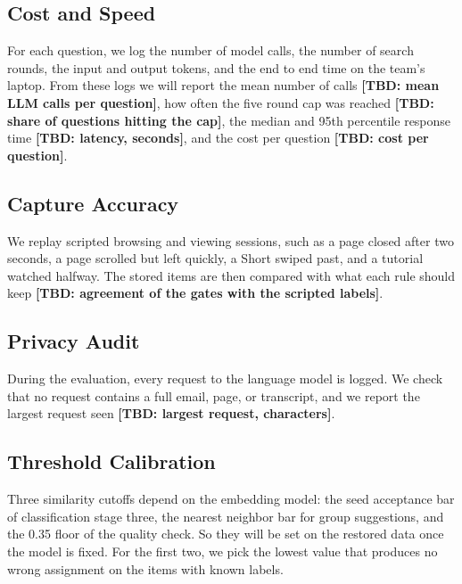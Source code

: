 \documentclass[conference]{IEEEtran}
\newcommand{\tbd}[1]{\textbf{[TBD: #1]}}
\begin{document}
\subsection{Cost and Speed}
For each question, we log the number of model calls, the number of search rounds, the input and output tokens, and the end to end time on the team's laptop. From these logs we will report the mean number of calls \tbd{mean LLM calls per question}, how often the five round cap was reached \tbd{share of questions hitting the cap}, the median and 95th percentile response time \tbd{latency, seconds}, and the cost per question \tbd{cost per question}.

\subsection{Capture Accuracy}
We replay scripted browsing and viewing sessions, such as a page closed after two seconds, a page scrolled but left quickly, a Short swiped past, and a tutorial watched halfway. The stored items are then compared with what each rule should keep \tbd{agreement of the gates with the scripted labels}.

\subsection{Privacy Audit}
During the evaluation, every request to the language model is logged. We check that no request contains a full email, page, or transcript, and we report the largest request seen \tbd{largest request, characters}.

\subsection{Threshold Calibration}
Three similarity cutoffs depend on the embedding model: the seed acceptance bar of classification stage three, the nearest neighbor bar for group suggestions, and the 0.35 floor of the quality check. So they will be set on the restored data once the model is fixed. For the first two, we pick the lowest value that produces no wrong assignment on the items with known labels.

\end{document}
